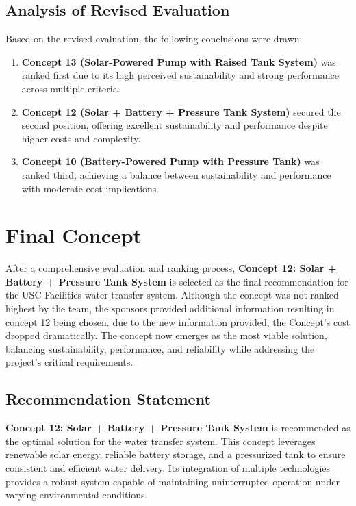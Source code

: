 \documentclass[12pt]{article}
\begin{document}
\subsection{Analysis of Revised Evaluation}

Based on the revised evaluation, the following conclusions were drawn:

\begin{enumerate}
    \item \textbf{Concept 13 (Solar-Powered Pump with Raised Tank System)} was ranked first due to its high perceived sustainability and strong performance across multiple criteria.
    \item \textbf{Concept 12 (Solar + Battery + Pressure Tank System)} secured the second position, offering excellent sustainability and performance despite higher costs and complexity.
    \item \textbf{Concept 10 (Battery-Powered Pump with Pressure Tank)} was ranked third, achieving a balance between sustainability and performance with moderate cost implications.
\end{enumerate}


\section{Final Concept}
\label{sec:final_concept}

After a comprehensive evaluation and ranking process, \textbf{Concept 12: Solar + Battery + Pressure Tank System} is selected as the final recommendation for the USC Facilities water transfer system. Although the concept was not ranked highest by the team, the sponsors provided additional information resulting in concept 12 being chosen. due to the new information provided, the Concept's cost dropped dramatically. The concept now emerges as the most viable solution, balancing sustainability, performance, and reliability while addressing the project's critical requirements.

\subsection{Recommendation Statement}

\textbf{Concept 12: Solar + Battery + Pressure Tank System} is recommended as the optimal solution for the water transfer system. This concept leverages renewable solar energy, reliable battery storage, and a pressurized tank to ensure consistent and efficient water delivery. Its integration of multiple technologies provides a robust system capable of maintaining uninterrupted operation under varying environmental conditions.
\end{document}
